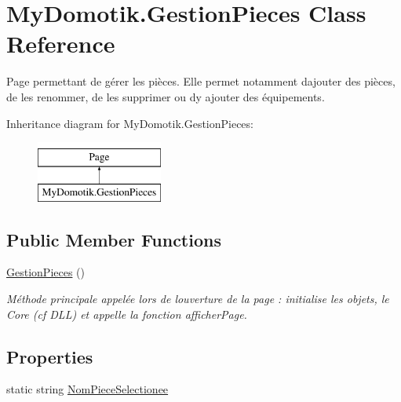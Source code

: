 \hypertarget{class_my_domotik_1_1_gestion_pieces}{}\section{My\+Domotik.\+Gestion\+Pieces Class Reference}
\label{class_my_domotik_1_1_gestion_pieces}


Page permettant de gérer les pièces. Elle permet notamment d\textquotesingle{}ajouter des pièces, de les renommer, de les supprimer ou d\textquotesingle{}y ajouter des équipements.  


Inheritance diagram for My\+Domotik.\+Gestion\+Pieces\+:\begin{figure}[H]
\begin{center}
\leavevmode
\includegraphics[height=2.000000cm]{class_my_domotik_1_1_gestion_pieces}
\end{center}
\end{figure}
\subsection*{Public Member Functions}
\begin{DoxyCompactItemize}
\item 
\hyperlink{class_my_domotik_1_1_gestion_pieces_a8ebf7bb45ced4d6fec2c9c756487c217}{Gestion\+Pieces} ()
\begin{DoxyCompactList}\small\item\em Méthode principale appelée lors de l\textquotesingle{}ouverture de la page \+: initialise les objets, le Core (cf D\+LL) et appelle la fonction afficher\+Page. \end{DoxyCompactList}\end{DoxyCompactItemize}
\subsection*{Properties}
\begin{DoxyCompactItemize}
\item 
static string \hyperlink{class_my_domotik_1_1_gestion_pieces_a67a89cb8b8c4baa3b965c1e0cd991d0f}{Nom\+Piece\+Selectionee}
\end{DoxyCompactItemize}
